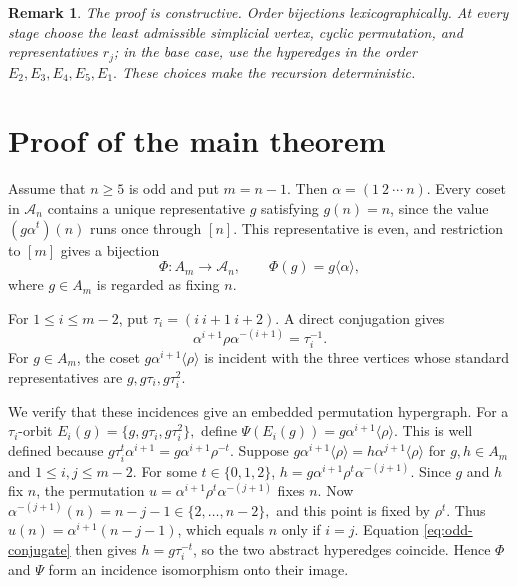 \documentclass[4pt]{article} %
\newtheorem{remark}[theorem]{Remark}
\newcommand{\la}{\langle}
\newcommand{\ra}{\rangle}
\begin{document}
\begin{remark}\label{rem:deterministic}
The proof is constructive. Order bijections lexicographically. At every
stage choose the least admissible simplicial vertex, cyclic permutation, and
representatives $r_j$; in the base case, use the hyperedges in the order
$
E_2,E_3,E_4,E_5,E_1.
$ These choices make the recursion deterministic.
\end{remark}

\section{Proof of the main theorem}\label{sec:odd}

Assume that $n\geq5$ is odd and put $m=n-1$. Then
$\alpha=(1\ 2\ \cdots\ n)$. Every coset in $\mathcal A_n$ contains a unique
representative $g$ satisfying $g(n)=n$, since the value
$(g\alpha^t)(n)$ runs once through $[n]$. This representative is even, and
restriction to $[m]$ gives a bijection
\begin{equation}\label{eq:odd-vertex-map}
 \Phi:A_m\longrightarrow\mathcal A_n,\qquad
 \Phi(g)=g\la\alpha\ra,
\end{equation}
where $g\in A_m$ is regarded as fixing $n$.

For $1\leq i\leq m-2$, put
$
 \tau_i=(i\ i+1\ i+2).
$
A direct conjugation gives
\begin{equation}\label{eq:odd-conjugate}
 \alpha^{i+1}\rho\alpha^{-(i+1)}=\tau_i^{-1}.
\end{equation}
For $g\in A_m$, the coset $g\alpha^{i+1}\la\rho\ra$ is incident with the
three vertices whose standard representatives are $g,g\tau_i,g\tau_i^2$.

We verify that these incidences give an embedded permutation hypergraph.
For a $\tau_i$-orbit
$
 E_i(g)=\{g,g\tau_i,g\tau_i^2\},
$
define
$
 \Psi(E_i(g))=g\alpha^{i+1}\la\rho\ra.
$
This is well defined because
$g\tau_i^t\alpha^{i+1}=g\alpha^{i+1}\rho^{-t}$. Suppose
$
 g\alpha^{i+1}\la\rho\ra
   =h\alpha^{j+1}\la\rho\ra
$
for $g,h\in A_m$ and $1\leq i,j\leq m-2$. For some
$t\in\{0,1,2\}$,
$
 h=g\alpha^{i+1}\rho^t\alpha^{-(j+1)}.
$
Since $g$ and $h$ fix $n$, the permutation
$u=\alpha^{i+1}\rho^t\alpha^{-(j+1)}$ fixes $n$. Now
$
 \alpha^{-(j+1)}(n)=n-j-1\in\{2,\ldots,n-2\},
$
and this point is fixed by $\rho^t$. Thus
$u(n)=\alpha^{i+1}(n-j-1)$, which equals $n$ only if $i=j$.
Equation \eqref{eq:odd-conjugate} then gives $h=g\tau_i^{-t}$, so the two
abstract hyperedges coincide. Hence $\Phi$ and $\Psi$ form an incidence
isomorphism onto their image.
\end{document}
